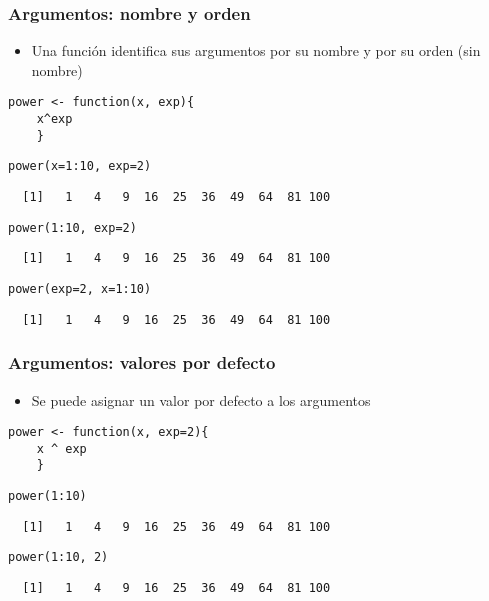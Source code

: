 \documentclass[xcolor={usenames,svgnames,dvipsnames}]{beamer}
\begin{document}
\begin{frame}[fragile]
\frametitle{Argumentos: nombre y orden}
\label{sec-1-5}


\begin{itemize}
\item Una función identifica sus argumentos por su nombre y por su orden (sin nombre)
\end{itemize}


\lstset{language=R}
\begin{lstlisting}
power <- function(x, exp){
    x^exp
    }
\end{lstlisting}



\lstset{language=R}
\begin{lstlisting}
power(x=1:10, exp=2)
\end{lstlisting}

\begin{verbatim}
  [1]   1   4   9  16  25  36  49  64  81 100
\end{verbatim}


\lstset{language=R}
\begin{lstlisting}
power(1:10, exp=2)
\end{lstlisting}

\begin{verbatim}
  [1]   1   4   9  16  25  36  49  64  81 100
\end{verbatim}


\lstset{language=R}
\begin{lstlisting}
power(exp=2, x=1:10)
\end{lstlisting}

\begin{verbatim}
  [1]   1   4   9  16  25  36  49  64  81 100
\end{verbatim}
\end{frame}
\begin{frame}[fragile]
\frametitle{Argumentos: valores por defecto}
\label{sec-1-6}

\begin{itemize}
\item Se puede asignar un valor por defecto a los argumentos
\end{itemize}

\lstset{language=R}
\begin{lstlisting}
power <- function(x, exp=2){
    x ^ exp
    }
\end{lstlisting}



\lstset{language=R}
\begin{lstlisting}
power(1:10)
\end{lstlisting}

\begin{verbatim}
  [1]   1   4   9  16  25  36  49  64  81 100
\end{verbatim}


\lstset{language=R}
\begin{lstlisting}
power(1:10, 2)
\end{lstlisting}

\begin{verbatim}
  [1]   1   4   9  16  25  36  49  64  81 100
\end{verbatim}
\end{frame}
\end{document}
